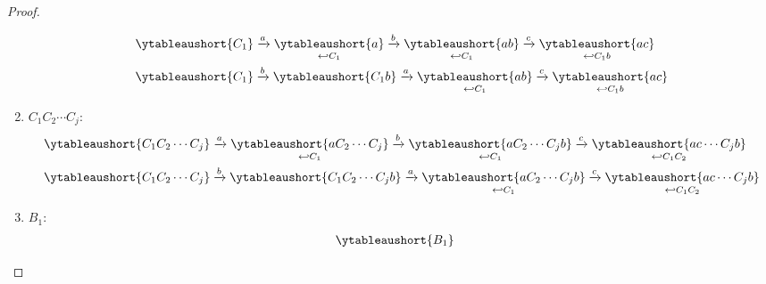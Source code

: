 \documentclass{article}
\begin{document}
\begin{proof}
\begin{enumerate}
\begin{align*}
                &
                \ytableaushort{{C_1}}
                \xrightarrow{a}
                \underset{
                    \hookleftarrow C_1
                }{\ytableaushort{a}}
                \xrightarrow{b}
                \underset{
                    \hookleftarrow C_1
                }{\ytableaushort{ab}}
                \xrightarrow{c}
                \underset{
                    \hookleftarrow C_1b
                }{\ytableaushort{ac}}
                \\
                &
                \ytableaushort{{C_1}}
                \xrightarrow{b}
                \ytableaushort{{C_1}b} 
                \xrightarrow{a}
                \underset{
                    \hookleftarrow C_1
                }{\ytableaushort{ab}}
                \xrightarrow{c}
                \underset{
                    \hookleftarrow C_1b
                }{\ytableaushort{ac}}
            \end{align*}
        \item 
            $C_1 C_2 \cdots C_j$:
            \begin{align*}
                &
                \ytableaushort{{C_1}{C_2}\cdots{C_j}}
                \xrightarrow{a}
                \underset{
                    \hookleftarrow C_1
                }{
                    \ytableaushort{a{C_2}\cdots{C_j}}
                }
                \xrightarrow{b}
                \underset{
                    \hookleftarrow C_1 
                }{
                    \ytableaushort{a{C_2}\cdots{C_j}b}
                }
                \xrightarrow{c}
                \underset{
                    \hookleftarrow C_1 C_2
                }{
                    \ytableaushort{ac\cdots{C_j}b}
                } \\
                &
                \ytableaushort{{C_1}{C_2}\cdots{C_j}}
                \xrightarrow{b}
                \ytableaushort{{C_1}{C_2}\cdots{C_j}b}
                \xrightarrow{a}
                \underset{
                    \hookleftarrow C_1 
                }{
                    \ytableaushort{a{C_2}\cdots{C_j}b}
                }
                \xrightarrow{c}
                \underset{
                    \hookleftarrow C_1 C_2
                }{
                    \ytableaushort{ac\cdots{C_j}b}
                }
            \end{align*}
        \item 
            $B_1$:
            \begin{align*}
                &
                \ytableaushort{{B_1}}

\end{align*}
\end{enumerate}
\end{proof}
\end{document}
